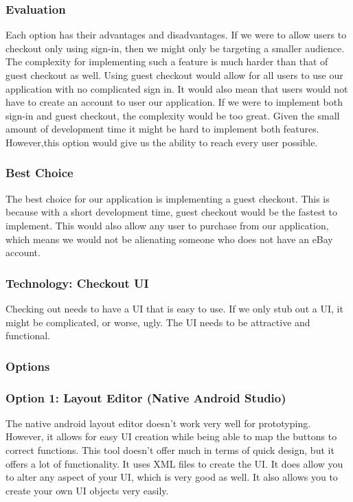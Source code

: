 \documentclass[journal,compsoc, 10pt, draftclsnofoot, onecolumn]{IEEEtran}
\begin{document}
\subsubsection*{Evaluation}
Each option has their advantages and disadvantages. If we were to allow users to
 checkout only using sign-in, then we might only be targeting a smaller audience.
 The complexity for implementing such a feature is much harder than that of 
guest checkout as well. Using guest checkout would allow for all users to use our
application with no complicated sign in. It would also mean that users would not 
have to create an account to user our application. If we were to implement both
sign-in and guest checkout, the complexity would be too great. Given the small
amount of development time it might be hard to implement both features. 
However,this option would give us the ability to reach every user possible.

\subsubsection*{Best Choice}
The best choice for our application is implementing a guest checkout. This is
because with a short development time, guest checkout would be the fastest to
implement. This would also allow any user to purchase from our application,
which means we would not be alienating someone who does not have an eBay
account.

\subsubsection{Technology: Checkout UI}
Checking out needs to have a UI that is easy to use. If we only stub out a UI,
it might be complicated, or worse, ugly. The UI needs to be attractive and
functional.

\subsubsection*{Options}
\subsubsection*{Option 1: Layout Editor (Native Android Studio)}
The native android layout editor doesn't work very well for prototyping.
However, it allows for easy UI creation while being able to map the buttons to
correct functions. This tool doesn't offer much in terms of quick design, but it
offers a lot of functionality. It uses XML files to create the UI. It does allow
you to alter any aspect of your UI, which is very good as well. It also allows
you to create your own UI objects very easily.
\end{document}
